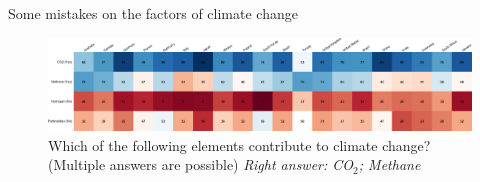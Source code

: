 \begin{frame}{Some mistakes on the factors of climate change}%
	\begin{figure}[h!]
	\centering
	\caption{Which of the following elements contribute to climate change? (Multiple answers are possible) \newline \footnotesize{\textit{Right answer: CO$_\text{2}$; Methane}}}
	\centering
	\includegraphics[width=\textwidth]{../figures/country_comparison/GHG_positive_countries.png}
	
	\end{figure}
\end{frame}
	
	
